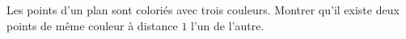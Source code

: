 Les points d'un plan sont coloriés avec trois couleurs. Montrer qu'il existe deux points de même couleur à distance $1$ l'un de l'autre.
